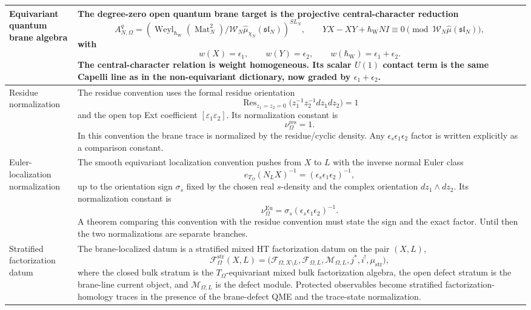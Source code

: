 \begin{longtable}{@{}>{\raggedright\arraybackslash}p{}
  >{\raggedright\arraybackslash}p{}@{}}
\hline
Equivariant quantum brane algebra &
The degree-zero open quantum brane target is the projective
central-character reduction
\[
  A^q_{N,\Omega}
  =
  \left(
  \operatorname{Weyl}_{\hbar_{\mathrm{W}}}(\operatorname{Mat}_N^2)/
  \mathcal W_N\widehat\mu_{\chi_N}(\mathfrak{sl}_N)
  \right)^{SL_N},
  \qquad
  YX-XY+\hbar_{\mathrm{W}}NI\equiv0
  \pmod{\mathcal W_N\widehat\mu(\mathfrak{sl}_N)},
\]
with
\[
  w(X)=\epsilon_1,\qquad
  w(Y)=\epsilon_2,\qquad
  w(\hbar_{\mathrm{W}})=\epsilon_1+\epsilon_2.
\]
The central-character relation is weight homogeneous.  Its scalar \(U(1)\)
contact term is the same Capelli line as in the non-equivariant
dictionary, now graded by \(\epsilon_1+\epsilon_2\).\\
\hline
Residue normalization &
The residue convention uses the formal residue orientation
\[
  \operatorname{Res}_{z_1=z_2=0}
  \bigl(z_1^{-1}z_2^{-1}dz_1dz_2\bigr)=1
\]
and the open top Ext coefficient
\([\varepsilon_1\varepsilon_2]\).  Its normalization constant is
\[
  \nu_\Omega^{\mathrm{res}}=1.
\]
In this convention the brane trace is
normalized by the residue/cyclic density.  Any
\(\epsilon_s\epsilon_1\epsilon_2\) factor is written explicitly as a
comparison constant.\\
\hline
Euler-localization normalization &
The smooth equivariant localization convention pushes from \(X\) to \(L\)
with the inverse normal Euler class
\[
  e_{T_\Omega}(N_LX)^{-1}
  =
  (\epsilon_s\epsilon_1\epsilon_2)^{-1},
\]
up to the orientation sign \(\sigma_s\) fixed by the chosen real
\(s\)-density and the complex orientation \(dz_1\wedge dz_2\).  Its
normalization constant is
\[
  \nu_\Omega^{\mathrm{Eu}}
  =
  \sigma_s(\epsilon_s\epsilon_1\epsilon_2)^{-1}.
\]
A theorem comparing this
convention with the residue convention must state the sign and the exact
factor.  Until then the two normalizations are separate branches.\\
\hline
Stratified factorization datum &
The brane-localized datum is a stratified mixed HT factorization datum
on the pair \((X,L)\),
\[
  \mathcal F^{\mathrm{str}}_\Omega(X,L)
  =
  \bigl(\mathcal F_{\Omega,X\setminus L},
        \mathcal F_{\Omega,L},
        \mathcal M_{\Omega,L},
        j^*,i^!,\mu_{\mathrm{str}}\bigr),
\]
where the closed bulk stratum is the \(T_\Omega\)-equivariant mixed
bulk factorization algebra, the open defect stratum is the brane-line
current object, and \(\mathcal M_{\Omega,L}\) is the defect module.  Protected
observables become stratified factorization-homology traces in the
presence of the brane-defect QME and the trace-state normalization.\\

\end{longtable}
